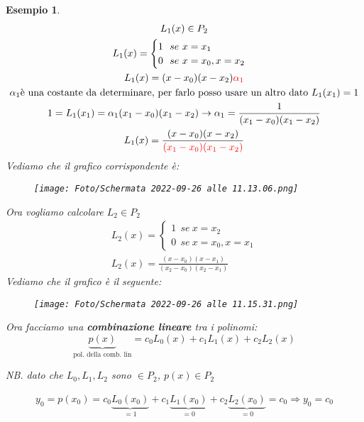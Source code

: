 \documentclass[a4paper, portrait]{book}
\numberwithin{equation}{chapter} %
\newtheorem{example}{Esempio}
\begin{document}
\begin{example}
    \begin{gather}
        L_1(x) \in P_2\\
        L_1(x) = \begin{cases}
            1 \ \ se \ x = x_1\\
            0 \ \ se \ x = x_0, x = x_2
        \end{cases}\\
        L_1(x) = (x-x_0)(x-x_2)\color{red}{\alpha_1}\\
        \alpha_1 \text{è una costante da determinare, per farlo posso usare un altro dato\ } L_1(x_1) = 1\\
        1 = L_1(x_1) = \alpha_1 (x_1 - x_0)(x_1 - x_2) \rightarrow \alpha_1 = \frac{1}{(x_1- x_0)(x_1-x_2)}\\
        L_1(x) = \frac{(x - x_0)(x-x_2)}{\color{red}{(x_1 - x_0)(x_1-x_2)}}
    \end{gather}
    Vediamo che il grafico corrispondente è:
    \begin{figure}[h!]
        \centering
        \texttt{[image: Foto/Schermata 2022-09-26 alle 11.13.06.png]}
        \caption{}
    \end{figure}
    Ora vogliamo calcolare $L_2 \in P_2$
    \begin{gather}
        L_2 (x) = \begin{cases}
            1 \ \ se \ x = x_2\\
            0 \ \ se \ x = x_0, x = x_1
        \end{cases}\\
        L_2 (x) = \frac{(x-x_0)(x - x_1)}{(x_2 - x_0)(x_2 - x_1)}
    \end{gather}
    Vediamo che il grafico è il seguente:
    \begin{figure}
        \centering
        \texttt{[image: Foto/Schermata 2022-09-26 alle 11.15.31.png]}
        \caption{}
    \end{figure}
    \newpage Ora facciamo una \textbf{combinazione lineare} tra i polinomi:
    \begin{equation}
        \underbrace{p(x)}_{\text{pol. della comb. lin}} = c_0 L_0(x) + c_1 L_1(x) + c_2 L_2(x)
    \end{equation}
    \begin{center}
        NB. dato che $L_0,L_1,L_2$ sono $\in P_2$, $p(x) \in P_2$
    \end{center}
    \begin{gather}
        y_0 = p(x_0) = c_0 \underbrace{L_0(x_0)}_{=1} + c_1\underbrace{L_1(x_0)}_{= 0} + c_2 \underbrace{L_2(x_0)}_{=0} = c_0 \Rightarrow y_0 = c_0\\

\end{gather}
\end{example}
\end{document}
